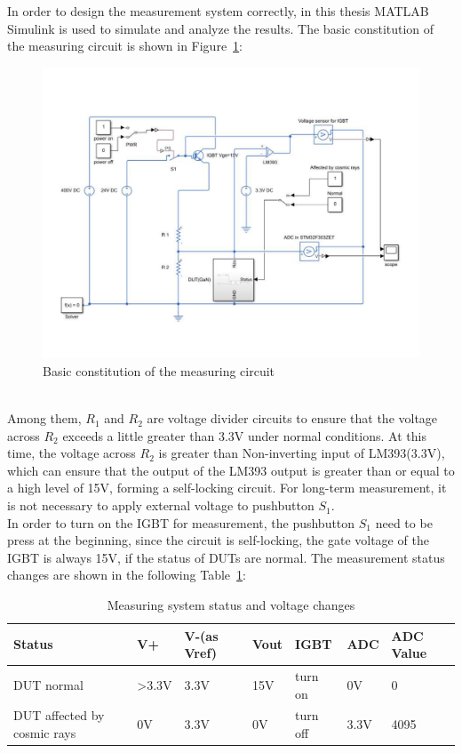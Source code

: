 In order to design the measurement system correctly, in this thesis MATLAB Simulink is used to simulate and analyze the results.
The basic constitution of the measuring circuit is shown in Figure~\ref{fig:3.3}:
\begin{figure}[!ht]
	\centering
	\includegraphics[width=17cm]{grafiken/3.3.pdf}
	\caption{Basic constitution of the measuring circuit} 
	\label{fig:3.3}
\end{figure}
\FloatBarrier
\\
Among them, $R_{1}$ and $R_{2}$ are voltage divider circuits to ensure that the voltage across $R_{2}$ exceeds a little greater than 3.3V under normal conditions. At this time, the voltage across $R_{2}$ is greater than Non-inverting input of LM393(3.3V), which can ensure that the output of the LM393 output is greater than or equal to a high level of 15V, forming a self-locking circuit. For long-term measurement, it is not necessary to apply external voltage to pushbutton $S_{1}$.
\\
In order to turn on the IGBT for measurement, the pushbutton $S_{1}$ need to be press 
at the beginning, since the circuit is self-locking, the gate voltage of the IGBT is always 15V, if the status of DUTs are normal. The measurement
status changes are shown in the following Table~\ref{tab:3.1}:
 
\begin{table}[]
\begin{tabular}{@{}|l|l|l|l|l|l|l|@{}}
\toprule
\rowcolor[HTML]{EFEFEF} 
Status                      & V+ & V-(as Vref) & Vout & IGBT     & ADC  & ADC Value \\ \midrule
DUT normal                  & >3.3V & 3.3V       & 15V  & turn on  & 0V   & 0         \\ \midrule
DUT affected by cosmic rays & 0V & 3.3V        & 0V   & turn off & 3.3V & 4095      \\ \bottomrule
\end{tabular}
	\caption{Measuring system status and voltage changes}
	\label{tab:3.1}
\end{table}

